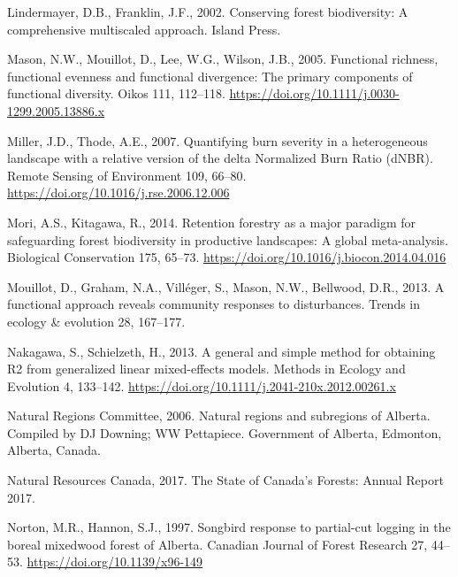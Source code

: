 \documentclass[
  12pt,
]{article}
\newlength{\cslhangindent}
\newlength{\cslentryspacingunit} %
\newenvironment{CSLReferences}[2] %
 {%
  \setlength{\parindent}{0pt}
  \ifodd #1
  \let\oldpar\par
  \def\par{\hangindent=\cslhangindent\oldpar}
  \fi
  \setlength{\parskip}{#2\cslentryspacingunit}
 }%
 {}
\begin{document}
\begin{CSLReferences}{1}{0}
\leavevmode{}%
Lindermayer, D.B., Franklin, J.F., 2002. Conserving forest biodiversity: A comprehensive multiscaled approach. Island Press.

\leavevmode{}%
Mason, N.W., Mouillot, D., Lee, W.G., Wilson, J.B., 2005. Functional richness, functional evenness and functional divergence: The primary components of functional diversity. Oikos 111, 112--118. \url{https://doi.org/10.1111/j.0030-1299.2005.13886.x}

\leavevmode{}%
Miller, J.D., Thode, A.E., 2007. Quantifying burn severity in a heterogeneous landscape with a relative version of the delta {Normalized} {Burn} {Ratio} ({dNBR}). Remote Sensing of Environment 109, 66--80. \url{https://doi.org/10.1016/j.rse.2006.12.006}

\leavevmode{}%
Mori, A.S., Kitagawa, R., 2014. Retention forestry as a major paradigm for safeguarding forest biodiversity in productive landscapes: {A} global meta-analysis. Biological Conservation 175, 65--73. \url{https://doi.org/10.1016/j.biocon.2014.04.016}

\leavevmode{}%
Mouillot, D., Graham, N.A., Villéger, S., Mason, N.W., Bellwood, D.R., 2013. A functional approach reveals community responses to disturbances. Trends in ecology \& evolution 28, 167--177.

\leavevmode{}%
Nakagawa, S., Schielzeth, H., 2013. A general and simple method for obtaining {R2} from generalized linear mixed-effects models. Methods in Ecology and Evolution 4, 133--142. \url{https://doi.org/10.1111/j.2041-210x.2012.00261.x}

\leavevmode{}%
Natural Regions Committee, 2006. Natural regions and subregions of {Alberta}. Compiled by DJ Downing; WW Pettapiece. Government of Alberta, Edmonton, Alberta, Canada.

\leavevmode{}%
Natural Resources Canada, 2017. The {State} of {Canada}'s {Forests}: {Annual} {Report} 2017.

\leavevmode{}%
Norton, M.R., Hannon, S.J., 1997. Songbird response to partial-cut logging in the boreal mixedwood forest of {Alberta}. Canadian Journal of Forest Research 27, 44--53. \url{https://doi.org/10.1139/x96-149}


\end{CSLReferences}
\end{document}
